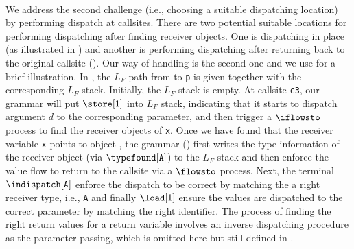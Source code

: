 \paragraph{ } We address the second challenge (i.e., choosing a
suitable dispatching location) by performing dispatch at callsites. There are
two potential suitable locations for performing dispatching after finding 
receiver objects.
One is dispatching in place (as illustrated in ) and
another is performing
dispatching after returning back to the original callsite (). 
Our way of handling is the second one and we use 
 for a brief illustration. 
In , the $L_F$-path  from 
to \texttt{p} is given together with the corresponding $L_F$ stack. Initially, the $L_F$ stack is empty. At callsite \texttt{c3}, our grammar will put $\store[1]$ into $L_F$ stack, indicating that it starts to dispatch argument $d$ to the corresponding parameter, and then trigger a $\iflowsto$ process to find the receiver objects of \texttt{x}. Once we have found that the receiver variable \texttt{x} points to object , the grammar (\dispatch) first writes the type
information of the receiver object (via $\typefound[\mathtt{A}]$) to the $L_F$ stack and then
enforce the value flow to return to the callsite via a $\flowsto$ process. Next, the terminal $\indispatch[\mathtt{A}]$
enforce the dispatch to be correct by matching the a right receiver type, i.e., \texttt{A} and finally $\load[1]$ ensure the values are
dispatched to the correct parameter by matching the right identifier.  
The process of finding the right return values for a return variable involves an inverse dispatching procedure as the parameter passing, which is omitted here but still defined in \dispatch. 

